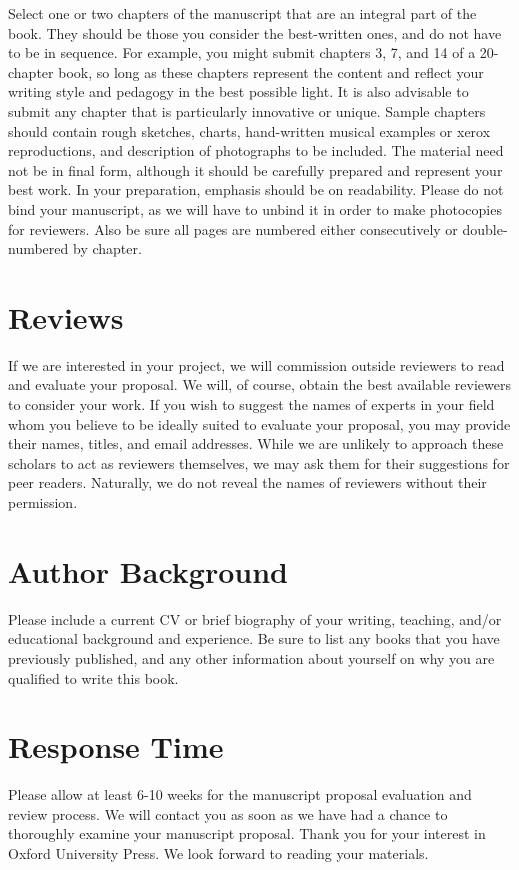 \documentclass[10pt,dvipsnames,enabledeprecatedfontcommands]{scrartcl}
\begin{document}
Select one or two chapters of the manuscript that are an integral part
of the book. They should be those you consider the best-written ones,
and do not have to be in sequence. For example, you might submit
chapters 3, 7, and 14 of a 20-chapter book, so long as these chapters
represent the content and reflect your writing style and pedagogy in the
best possible light. It is also advisable to submit any chapter that is
particularly innovative or unique. Sample chapters should contain rough
sketches, charts, hand-written musical examples or xerox reproductions,
and description of photographs to be included. The material need not be
in final form, although it should be carefully prepared and represent
your best work. In your preparation, emphasis should be on readability.
Please do not bind your manuscript, as we will have to unbind it in
order to make photocopies for reviewers. Also be sure all pages are
numbered either consecutively or double-numbered by chapter.

\hypertarget{reviews}{%
\section{Reviews}\label{reviews}}

If we are interested in your project, we will commission outside
reviewers to read and evaluate your proposal. We will, of course, obtain
the best available reviewers to consider your work. If you wish to
suggest the names of experts in your field whom you believe to be
ideally suited to evaluate your proposal, you may provide their names,
titles, and email addresses. While we are unlikely to approach these
scholars to act as reviewers themselves, we may ask them for their
suggestions for peer readers. Naturally, we do not reveal the names of
reviewers without their permission.

\hypertarget{author-background}{%
\section{Author Background}\label{author-background}}

Please include a current CV or brief biography of your writing,
teaching, and/or educational background and experience. Be sure to list
any books that you have previously published, and any other information
about yourself on why you are qualified to write this book.

\hypertarget{response-time}{%
\section{Response Time}\label{response-time}}

Please allow at least 6-10 weeks for the manuscript proposal evaluation
and review process. We will contact you as soon as we have had a chance
to thoroughly examine your manuscript proposal. Thank you for your
interest in Oxford University Press. We look forward to reading your
materials.
\end{document}
